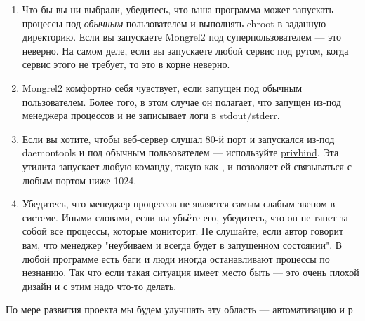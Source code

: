 \begin{enumerate}

\item Что бы вы ни выбрали, убедитесь, что ваша программа может запускать
процессы под \emph{обычным} пользователем и выполнять chroot в заданную
директорию.  Если вы запускаете Mongrel2 под суперпользователем --- это неверно.
На самом деле, если вы запускаете любой сервис под рутом, когда сервис этого не
требует, то это в корне неверно.

\item Mongrel2 комфортно себя чувствует, если запущен под обычным пользователем.
Более того, в этом случае он полагает, что запущен из-под менеджера процессов и
не записывает логи в stdout/stderr.

\item Если вы хотите, чтобы веб-сервер слушал 80-й порт и запускался из-под
daemontools и под обычным пользователем --- используйте
\href{http://manpages.ubuntu.com/manpages/lucid/man1/privbind.1.html}{privbind}.
Эта утилита запускает любую команду, такую как , и позволяет ей
связываться с любым портом ниже 1024.

\item Убедитесь, что менеджер процессов не является самым слабым звеном в
системе. Иными словами, если вы убьёте его, убедитесь, что он не тянет
за собой все процессы, которые мониторит. Не слушайте, если автор говорит вам,
что менеджер "неубиваем и всегда будет в запущенном состоянии". В любой
программе есть баги и люди иногда останавливают процессы по незнанию. Так что
если такая ситуация имеет место быть --- это очень плохой дизайн и с этим надо
что-то делать.

\end{enumerate}

По мере развития проекта мы будем улучшать эту область --- автоматизацию и
р
